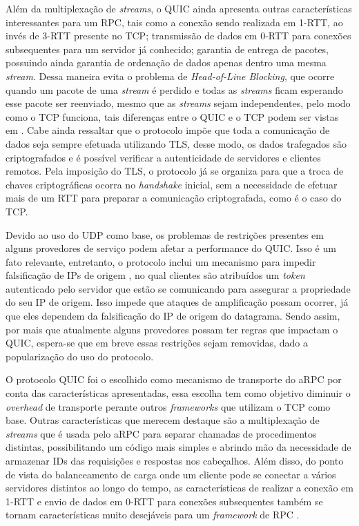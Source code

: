 Além da multiplexação de \textit{streams}, o QUIC ainda apresenta outras características interessantes para um RPC, tais como a conexão sendo realizada em 1-RTT, ao invés de 3-RTT presente no TCP; transmissão de dados em 0-RTT para conexões subsequentes para um servidor já conhecido; garantia de entrega de pacotes, possuindo ainda garantia de ordenação de dados apenas dentro uma mesma \textit{stream}. Dessa maneira evita o problema de \textit{Head-of-Line Blocking}, que ocorre quando um pacote de uma \textit{stream} é perdido e todas as \textit{streams} ficam esperando esse pacote ser reenviado, mesmo que as \emph{streams} sejam independentes, pelo modo como o TCP funciona, tais diferenças entre o QUIC e o TCP podem ser vistas em \cite{cook_quic_2017}. Cabe ainda ressaltar que o protocolo impõe que toda a comunicação de dados seja sempre efetuada utilizando TLS, desse modo, os dados trafegados são criptografados e é possível verificar a autenticidade de servidores e clientes remotos. Pela imposição do TLS, o protocolo já se organiza para que a troca de chaves criptográficas ocorra no \textit{handshake} inicial, sem a necessidade de efetuar mais de um RTT para preparar a comunicação criptografada, como é o caso do TCP.

Devido ao uso do UDP como base, os problemas de restrições presentes em alguns provedores de serviço podem afetar a performance do QUIC. Isso é um fato relevante, entretanto, o protocolo inclui um mecanismo para impedir falsificação de IPs de origem \cite{rossow2014amplification}, no qual clientes são atribuídos um \textit{token} autenticado pelo servidor que estão se comunicando para assegurar a propriedade do seu IP de origem. Isso impede que ataques de amplificação possam ocorrer, já que eles dependem da falsificação do IP de origem do datagrama. Sendo assim, por mais que atualmente alguns provedores possam ter regras que impactam o QUIC, espera-se que em breve essas restrições sejam removidas, dado a popularização do uso do protocolo.

O protocolo QUIC foi o escolhido como mecanismo de transporte do aRPC por conta das características apresentadas, essa escolha tem como objetivo diminuir o \textit{overhead} de transporte perante outros \textit{frameworks} que utilizam o TCP como base. Outras características que merecem destaque são a multiplexação de \textit{streams} que é usada pelo aRPC para separar chamadas de procedimentos distintas, possibilitando um código mais simples e abrindo mão da necessidade de armazenar IDs das requisições e respostas nos cabeçalhos. Além disso, do ponto de vista do balanceamento de carga onde um cliente pode se conectar a vários servidores distintos ao longo do tempo, as características de realizar a conexão em 1-RTT e envio de dados em 0-RTT para conexões subsequentes também se tornam características muito desejáveis para um \textit{framework} de RPC \cite{fatemian_why_2020}.

